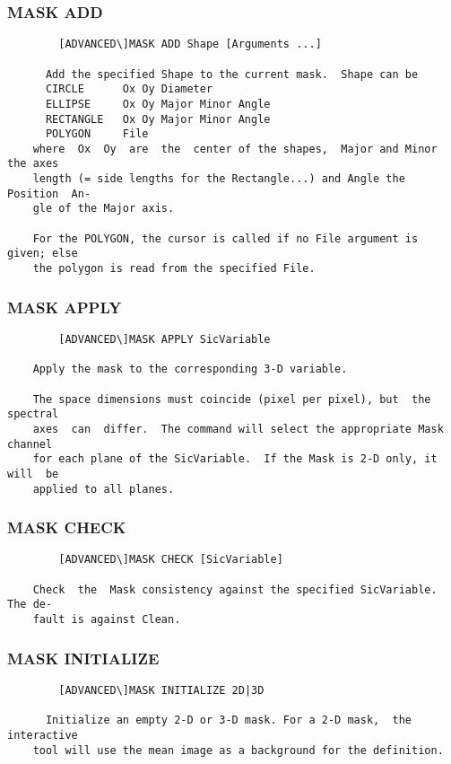 \subsubsection{MASK ADD}
\begin{verbatim}
        [ADVANCED\]MASK ADD Shape [Arguments ...]

      Add the specified Shape to the current mask.  Shape can be
      CIRCLE      Ox Oy Diameter
      ELLIPSE     Ox Oy Major Minor Angle
      RECTANGLE   Ox Oy Major Minor Angle
      POLYGON     File
    where  Ox  Oy  are  the  center of the shapes,  Major and Minor the axes
    length (= side lengths for the Rectangle...) and Angle the Position  An-
    gle of the Major axis.

    For the POLYGON, the cursor is called if no File argument is given; else
    the polygon is read from the specified File.

\end{verbatim}
\subsubsection{MASK APPLY}
\begin{verbatim}
        [ADVANCED\]MASK APPLY SicVariable

    Apply the mask to the corresponding 3-D variable.

    The space dimensions must coincide (pixel per pixel), but  the  spectral
    axes  can  differ.  The command will select the appropriate Mask channel
    for each plane of the SicVariable.  If the Mask is 2-D only, it will  be
    applied to all planes.

\end{verbatim}
\subsubsection{MASK CHECK}
\begin{verbatim}
        [ADVANCED\]MASK CHECK [SicVariable]

    Check  the  Mask consistency against the specified SicVariable.  The de-
    fault is against Clean.

\end{verbatim}
\subsubsection{MASK INITIALIZE}
\begin{verbatim}
        [ADVANCED\]MASK INITIALIZE 2D|3D

      Initialize an empty 2-D or 3-D mask. For a 2-D mask,  the  interactive
    tool will use the mean image as a background for the definition.

\end{verbatim}
